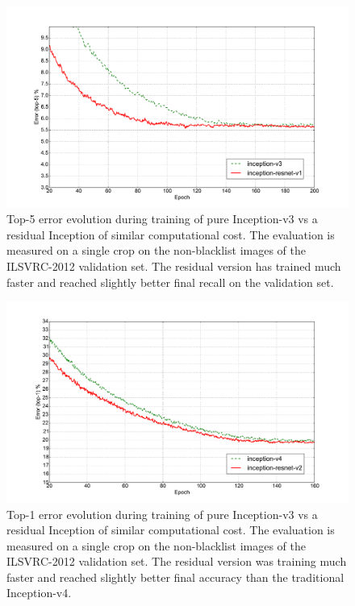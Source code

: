 \begin{figure}
\centering
\includegraphics[width=\linewidth]{small_top5}
\caption{Top-5 error evolution during training of pure Inception-v3 vs a
  residual Inception of similar computational cost. The evaluation is measured on
  a single crop on the non-blacklist images of the ILSVRC-2012 validation set.
  The residual version has trained much faster and reached slightly better final recall
  on the validation set.
}
\label{fig:smalltop5}
\end{figure}


\begin{figure}
\centering
\includegraphics[width=\linewidth]{wide_top1}
\caption{Top-1 error evolution during training of pure Inception-v3 vs a
  residual Inception of similar computational cost. The evaluation is measured on
  a single crop on the non-blacklist images of the ILSVRC-2012 validation set.
  The residual version was training much faster and reached
  slightly better final accuracy than the traditional Inception-v4.
}
\label{fig:widetop1}
\end{figure}

